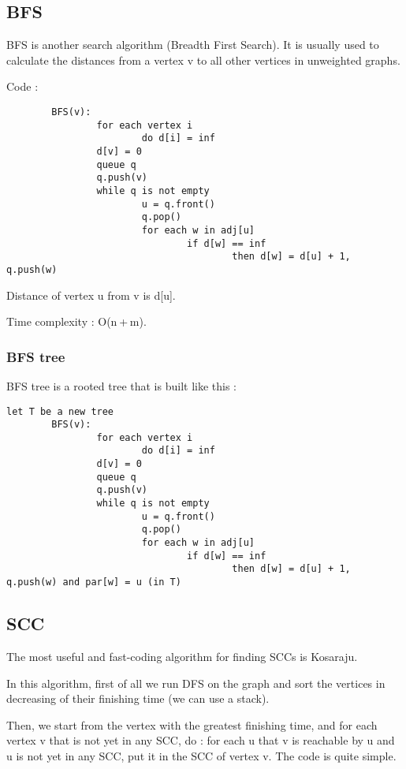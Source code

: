 \subsection{BFS}
BFS is another search algorithm (Breadth First Search). It is usually used to calculate the distances from a vertex v to all other vertices in unweighted graphs.

Code :
\begin{verbatim}
        BFS(v):
                for each vertex i
                        do d[i] = inf
                d[v] = 0
                queue q
                q.push(v)
                while q is not empty
                        u = q.front()
                        q.pop()
                        for each w in adj[u]
                                if d[w] == inf
                                        then d[w] = d[u] + 1, q.push(w)
\end{verbatim}
Distance of vertex u from v is d[u].

Time complexity : O(n + m).
\subsubsection{BFS tree}
BFS tree is a rooted tree that is built like this :
\begin{verbatim}
let T be a new tree
        BFS(v):
                for each vertex i
                        do d[i] = inf
                d[v] = 0
                queue q
                q.push(v)
                while q is not empty
                        u = q.front()
                        q.pop()
                        for each w in adj[u]
                                if d[w] == inf
                                        then d[w] = d[u] + 1, q.push(w) and par[w] = u (in T)
\end{verbatim}
\subsection{SCC}
The most useful and fast-coding algorithm for finding SCCs is Kosaraju.

In this algorithm, first of all we run DFS on the graph and sort the vertices in decreasing of their finishing time (we can use a stack).

Then, we start from the vertex with the greatest finishing time, and for each vertex v that is not yet in any SCC, do : for each u that v is reachable by u and u is not yet in any SCC, put it in the SCC of vertex v. The code is quite simple.

